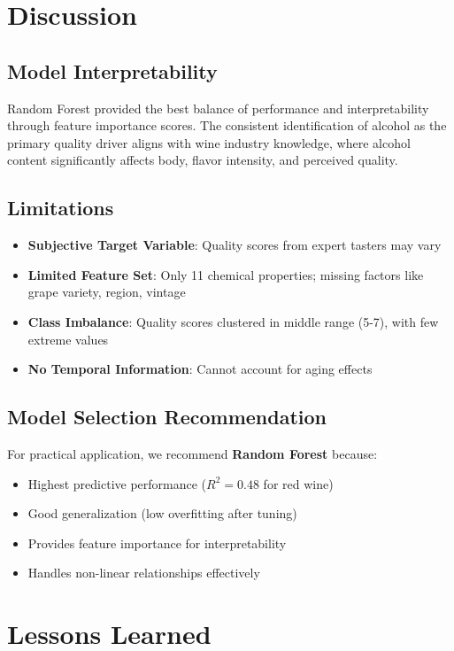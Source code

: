 \documentclass[12pt]{article}
\begin{document}
\section{Discussion}

\subsection{Model Interpretability}
Random Forest provided the best balance of performance and interpretability through feature importance scores. The consistent identification of alcohol as the primary quality driver aligns with wine industry knowledge, where alcohol content significantly affects body, flavor intensity, and perceived quality.

\subsection{Limitations}
\begin{itemize}
    \item \textbf{Subjective Target Variable}: Quality scores from expert tasters may vary
    \item \textbf{Limited Feature Set}: Only 11 chemical properties; missing factors like grape variety, region, vintage
    \item \textbf{Class Imbalance}: Quality scores clustered in middle range (5-7), with few extreme values
    \item \textbf{No Temporal Information}: Cannot account for aging effects
\end{itemize}

\subsection{Model Selection Recommendation}
For practical application, we recommend \textbf{Random Forest} because:
\begin{itemize}
    \item Highest predictive performance ($R^2 = 0.48$ for red wine)
    \item Good generalization (low overfitting after tuning)
    \item Provides feature importance for interpretability
    \item Handles non-linear relationships effectively
\end{itemize}

\section{Lessons Learned}
\end{document}

